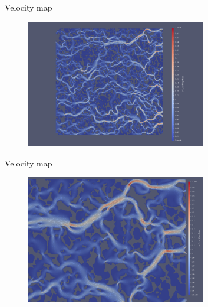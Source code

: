 \documentclass{beamer}
\begin{document}
	\begin{frame}{Velocity map}
		\begin{figure}
			\centering
			\includegraphics[width=0.7\textwidth]{pics/pmVelWhole.png}  
		\end{figure}
	\end{frame}

	\begin{frame}{Velocity map}
		\begin{figure}
			\centering
			\includegraphics[width=0.7\textwidth]{pics/pmVelUpperRight.png}  
		\end{figure}
	\end{frame}
\end{document}
